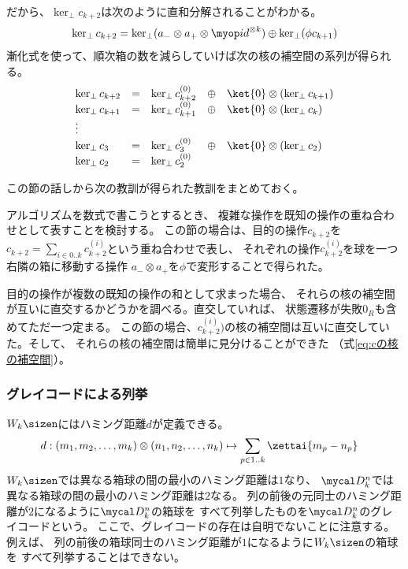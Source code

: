 	だから、$\ker_\perp c_{k+2}$は次のように直和分解されることがわかる。
	\begin{equation*}\begin{split} %
		\ker_\perp c_{k+2} 
		&= \ker_\perp(a_-\otimes a_+\otimes\id^{\otimes k})
			\oplus \ker_\perp(\phi c_{k+1}) \\
	\end{split}\end{equation*} %
	漸化式を使って、順次箱の数を減らしていけば次の核の補空間の系列が得られる。
	\begin{equation*}\begin{array}{lclcl} %
		\ker_\perp c_{k+2} &=& \ker_\perp c_{k+2}^{(0)}
			&\oplus& \ket{0}\otimes(\ker_\perp c_{k+1}) \\
		\ker_\perp c_{k+1} &=& \ker_\perp c_{k+1}^{(0)}
			&\oplus& \ket{0}\otimes(\ker_\perp c_{k}) \\
		\vdots & \\
		\ker_\perp c_{3} &=& \ker_\perp c_3^{(0)}
			&\oplus& \ket{0}\otimes(\ker_\perp c_{2}) \\
		\ker_\perp c_{2} &=& \ker_\perp c_2^{(0)}
	\end{array}\end{equation*} %

	この節の話しから次の教訓が得られた教訓をまとめておく。
	\begin{description}\setlength{\itemsep}{-1mm} %
		\item[操作の重ねあわせ] アルゴリズムを数式で書こうとするとき、
		複雑な操作を既知の操作の重ね合わせとして表すことを検討する。
		この節の場合は、目的の操作$c_{k+2}$を
		$c_{k+2}=\sum_{i\in0..k}c_{k+2}^{(i)}$という重ね合わせで表し、
		それぞれの操作$c_{k+2}^{(i)}$を球を一つ右隣の箱に移動する操作
		$a_-\otimes a_+$を$\phi$で変形することで得られた。
		\item[核の補空間] 目的の操作が複数の既知の操作の和として求まった場合、
		それらの核の補空間が互いに直交するかどうかを調べる。直交していれば、
		状態遷移が失敗$0_R$も含めてただ一つ定まる。
		この節の場合、$c_{k+2}^{(i)})$の核の補空間は互いに直交していた。そして、
		それらの核の補空間は簡単に見分けることができた
		（式\eqref{eq:cの核の補空間}）。
	\end{description} %
\subsubsection{グレイコードによる列挙}\label{s2:グレイコードによる列挙} %
	$W_k\sizen$にはハミング距離$d$が定義できる。
	\begin{equation*}\begin{split} %
		d:(m_1,m_2,\dots,m_k)\otimes(n_1,n_2,\dots,n_k)
		&\mapsto \sum_{p\in1..k}\zettai{m_p-n_p}
	\end{split}\end{equation*} %
	$W_k\sizen$では異なる箱球の間の最小のハミング距離は$1$なり、
	$\hakodama_k^n$では異なる箱球の間の最小のハミング距離は$2$なる。
	列の前後の元同士のハミング距離が$2$になるように$\hakodama_k^n$の箱球を
	すべて列挙したものを$\hakodama_k^n$のグレイコードという。
	ここで、グレイコードの存在は自明でないことに注意する。例えば、
	列の前後の箱球同士のハミング距離が$1$になるように$W_k\sizen$の箱球を
	すべて列挙することはできない。

